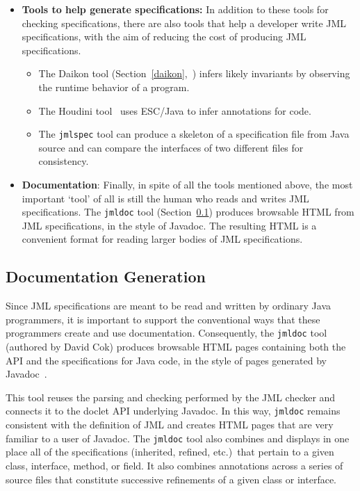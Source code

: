 \documentclass{entcs}
\begin{document}
\begin{itemize}
\item {\bf Tools to help generate specifications: } In addition to
  these tools for checking specifications, there are also tools that
  help a developer write JML specifications, with the aim of reducing
  the cost of producing JML specifications.
\begin{itemize}
\item The Daikon tool (Section~\ref{daikon},~\cite{ErnstCGN2001:TSE})
  infers likely invariants by observing the runtime behavior
  of a program.
\item The Houdini tool~\cite{Flanagan-Et-Al01} uses ESC/Java to infer
  annotations for code.
\item The {\tt jmlspec} tool can produce a skeleton of a
  specification file from Java source and can compare the interfaces of
  two different files for consistency.
\end{itemize}

\item {\bf Documentation}: Finally, in spite of all the tools
  mentioned above, the most important `tool' of all is still the human
  who reads and writes JML specifications.  The {\tt jmldoc} tool
  (Section~\ref{jmldoc}) produces browsable HTML from JML
  specifications, in the style of Javadoc.  The resulting HTML is a
  convenient format for reading larger bodies of JML specifications.

\end{itemize}

\subsection{Documentation Generation}
\label{jmldoc}

Since JML specifications are meant to be read and written by ordinary
Java programmers, it is important to support the conventional ways
that these programmers create and use documentation.  Consequently,
the {\tt jmldoc} tool (authored by David Cok)
produces browsable HTML pages containing both the
API and the specifications for Java code, in the style of pages
generated by Javadoc~\cite{Friendly95}.

This tool reuses the parsing and checking performed by the JML checker
and connects it to the doclet API underlying Javadoc.  In this way,
\texttt{jmldoc} remains consistent with the definition of JML and
creates HTML pages that are very familiar to a user of Javadoc.  The
{\tt jmldoc} tool also combines and displays in one place all of the
specifications (inherited, refined, etc.)\ that pertain to a given
class, interface, method, or field.  It also combines annotations
across a series of source files that constitute successive refinements
of a given class or interface.
\end{document}
